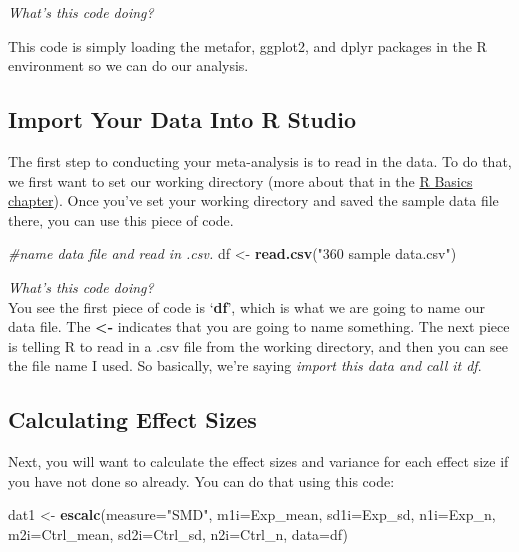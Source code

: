 \documentclass[
]{book}
\newenvironment{Shaded}{\begin{snugshade}}{\end{snugshade}}
\newcommand{\AttributeTok}[1]{\textcolor[rgb]{0.13,0.29,0.53}{#1}}
\newcommand{\CommentTok}[1]{\textcolor[rgb]{0.56,0.35,0.01}{\textit{#1}}}
\newcommand{\FunctionTok}[1]{\textcolor[rgb]{0.13,0.29,0.53}{\textbf{#1}}}
\newcommand{\NormalTok}[1]{#1}
\newcommand{\OtherTok}[1]{\textcolor[rgb]{0.56,0.35,0.01}{#1}}
\newcommand{\StringTok}[1]{\textcolor[rgb]{0.31,0.60,0.02}{#1}}
\begin{document}
\emph{What's this code doing?}

This code is simply loading the metafor, ggplot2, and dplyr packages in the R environment so we can do our analysis.

\hypertarget{import-your-data-into-r-studio-1}{%
\subsection{Import Your Data Into R Studio}\label{import-your-data-into-r-studio-1}}

The first step to conducting your meta-analysis is to read in the data. To do that, we first want to set our working directory (more about that in the \protect\hyperlink{rbasics}{R Basics chapter}). Once you've set your working directory and saved the sample data file there, you can use this piece of code.

\begin{Shaded}
\begin{Highlighting}[]
\CommentTok{\#name data file and read in .csv.}
\NormalTok{df }\OtherTok{\textless{}{-}} \FunctionTok{read.csv}\NormalTok{(}\StringTok{"360 sample data.csv"}\NormalTok{)}
\end{Highlighting}
\end{Shaded}

\emph{What's this code doing?\\
}You see the first piece of code is `\textbf{df}', which is what we are going to name our data file. The \textbf{\textless-} indicates that you are going to name something. The next piece is telling R to read in a .csv file from the working directory, and then you can see the file name I used. So basically, we're saying \emph{import this data and call it df}.

\hypertarget{calculating-effect-sizes-1}{%
\subsection{Calculating Effect Sizes}\label{calculating-effect-sizes-1}}

Next, you will want to calculate the effect sizes and variance for each effect size if you have not done so already. You can do that using this code:

\begin{Shaded}
\begin{Highlighting}[]
\NormalTok{dat1 }\OtherTok{\textless{}{-}} \FunctionTok{escalc}\NormalTok{(}\AttributeTok{measure=}\StringTok{"SMD"}\NormalTok{, }\AttributeTok{m1i=}\NormalTok{Exp\_mean, }\AttributeTok{sd1i=}\NormalTok{Exp\_sd, }\AttributeTok{n1i=}\NormalTok{Exp\_n,}
               \AttributeTok{m2i=}\NormalTok{Ctrl\_mean, }\AttributeTok{sd2i=}\NormalTok{Ctrl\_sd, }\AttributeTok{n2i=}\NormalTok{Ctrl\_n, }\AttributeTok{data=}\NormalTok{df)}
\end{Highlighting}
\end{Shaded}
\end{document}
